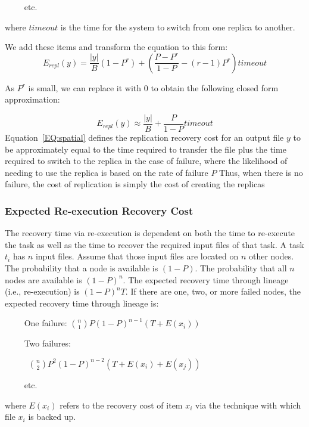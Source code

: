 \documentclass{sig-alternate}
\newcommand{\kylenote}[1]{{\textcolor{orange}    { ***Kyle:      #1 }}}
\newcommand{\kylenote}[1]{}
\begin{document}
\noindent ~~~~ etc.

\noindent where $timeout$ is the time for the system to switch from one replica to another.

We add these items and transform the equation to this form:
\begin{equation}
E_{repl}(y) = \frac{|y|}{B}\left(1-P^r\right) + \left(\frac{P-P^r}{1-P}-(r-1)P^r\right)timeout
\end{equation}

As $P^r$ is small, we can replace it with $0$ to obtain the following closed form approximation:

\begin{equation}
E_{repl}(y) \approx \frac{|y|}{B}+\frac{P}{1-P}timeout
\label{EQ:spatial}
\end{equation}
Equation~\ref{EQ:spatial} defines the replication recovery cost for an output file $y$ to be approximately 
equal to the time required to transfer the file plus the time required to switch to the replica
in the case of failure, where the likelihood of needing to use the replica is based on the rate of failure $P$
Thus, when there is no failure, the cost of replication is simply the cost of creating the replicas

\subsubsection{Expected Re-execution Recovery Cost}
The recovery time via re-execution is dependent on both the time to re-execute the task as well
as the time to recover the required input files of that task. 
A task $t_i$ has $n$ input files. Assume that those input files are located on $n$ other nodes.
The probability that a node is available is $(1-P)$. The probability that all $n$ nodes are available is $(1-P)^n$.
The expected recovery time through lineage (i.e., re-execution) is
$(1-P)^nT$. 
If there are one, two, or more failed nodes, the expected recovery time through lineage is:

\noindent ~~~~ One failure:
%
${n \choose 1}P(1-P)^{n-1}(T+E(x_i))$

\noindent ~~~~ Two failures:

~~~~~ ${n \choose 2}P^2(1-P)^{n-2}(T+E(x_i)+E(x_j))$

\noindent ~~~~ etc.

\noindent where ${E(x_i)}$ refers to the recovery cost of item ${x_i}$ via the technique with which file ${x_i}$ is backed up. 
\end{document}
